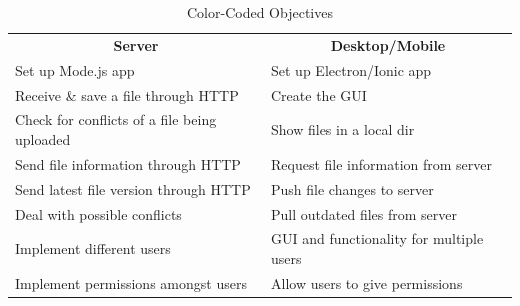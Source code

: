 \documentclass[11pt]{article}
\begin{document}
\begin{table}[htb]
\begin{tabular}{|l|l|}
\hline
\rowcolor[HTML]{38FFF8} 
\multicolumn{2}{|c|}{\cellcolor[HTML]{38FFF8}\textbf{Objectives}}                                \\ \hline
\multicolumn{1}{|c|}{\textbf{Server}}        & \multicolumn{1}{c|}{\textbf{Desktop/Mobile}}      \\ \hline
\rowcolor[HTML]{32CB00} 
Set up Mode.js app                           & Set up Electron/Ionic app                         \\ \hline
\rowcolor[HTML]{32CB00} 
Receive \& save a file through HTTP          & Create the GUI                                    \\ \hline
\rowcolor[HTML]{F8FF00} 
Check for conflicts of a file being uploaded & \cellcolor[HTML]{32CB00}Show files in a local dir \\ \hline
\rowcolor[HTML]{F8FF00} 
Send file information through HTTP           & Request file information from server              \\ \hline
\rowcolor[HTML]{F8FF00} 
Send latest file version through HTTP        & Push file changes to server                       \\ \hline
\rowcolor[HTML]{F8FF00} 
Deal with possible conflicts                 & Pull outdated files from server                   \\ \hline
\rowcolor[HTML]{FD6864} 
Implement different users                    & GUI and functionality for multiple users          \\ \hline
\rowcolor[HTML]{3166FF} 
Implement permissions amongst users          & Allow users to give permissions                   \\ \hline
\end{tabular}
\caption{Color-Coded Objectives}
\end{table} 
\end{document}
